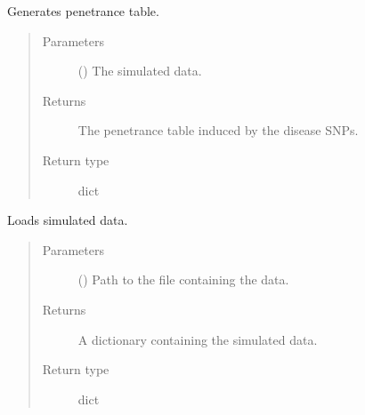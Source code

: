 \documentclass[a4paper,10pt,english]{sphinxhowto}
\begin{document}

\begin{fulllineitems}
\label{\detokenize{utils:utils.validation_utils.generate_penetrance_table}}
Generates penetrance table.
\begin{quote}\begin{description}
\item[{Parameters}] \leavevmode
{} () \textendash{} The simulated data.

\item[{Returns}] \leavevmode
The penetrance table induced by the disease SNPs.

\item[{Return type}] \leavevmode
dict

\end{description}\end{quote}

\end{fulllineitems}


\begin{fulllineitems}
\label{\detokenize{utils:utils.validation_utils.load_data}}
Loads simulated data.
\begin{quote}\begin{description}
\item[{Parameters}] \leavevmode
{} () \textendash{} Path to the file containing the data.

\item[{Returns}] \leavevmode
A dictionary containing the simulated data.

\item[{Return type}] \leavevmode
dict

\end{description}\end{quote}

\end{fulllineitems}
\end{document}
